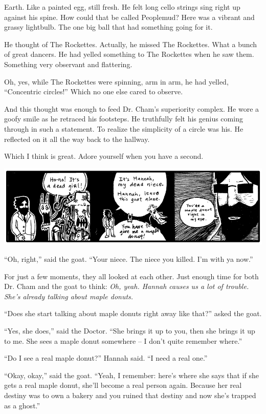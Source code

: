 \documentclass[10pt,twoside]{report}
\begin{document}
Earth.  Like a painted egg, still fresh.  He felt long cello strings
sing right up against his spine.  How could that be called Peoplemud?
Here was a vibrant and grassy lightbulb.  The one big ball that had
something going for it.

He thought of The Rockettes.  Actually, he missed The Rockettes.  What
a bunch of great dancers.  He had yelled something to The Rockettes
when he saw them.  Something very observant and flattering.

Oh, yes, while The Rockettes were spinning, arm in arm, he had yelled,
``Concentric circles!'' Which no one else cared to observe.

And this thought was enough to feed Dr. Cham's superiority complex.
He wore a goofy smile as he retraced his footsteps.  He truthfully
felt his genius coming through in such a statement.  To realize the
simplicity of a circle was his.  He reflected on it all the way back
to the hallway.

Which I think is great.  Adore yourself when you have a second.

	\includegraphics[width=1.0\textwidth]{cache/49.png}

``Oh, right,'' said the goat.  ``Your niece.  The niece you killed.
        I'm with ya now.''

For just a few moments, they all looked at each other.  Just enough
time for both Dr. Cham and the goat to think: {\em Oh, yeah.  Hannah
  causes us a lot of trouble.  She's already talking about maple
  donuts.}

``Does she start talking about maple donuts right away like that?''
asked the goat.

``Yes, she does,'' said the Doctor.  ``She brings it up to you, then
she brings it up to me.  She sees a maple donut somewhere -- I don't
quite remember where.''

``Do I see a real maple donut?'' Hannah said.  ``I need a real one.''

``Okay, okay,'' said the goat.  ``Yeah, I remember: here's where she
says that if she gets a real maple donut, she'll become a real person
again. Because her real destiny was to own a bakery and you ruined
that destiny and now she's trapped as a ghost.''
\end{document}
